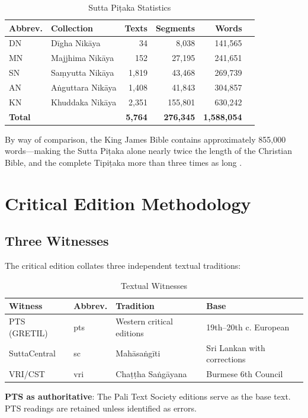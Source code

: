 \documentclass[unnumsec,webpdf,contemporary,large]{oup-authoring-template}
\begin{document}
\begin{table}[h]
\centering
\caption{Sutta Piṭaka Statistics}
\begin{tabular}{llrrrr}
\toprule
Abbrev. & Collection & Texts & Segments & Words \\
\midrule
DN & Dīgha Nikāya & 34 & 8,038 & 141,565 \\
MN & Majjhima Nikāya & 152 & 27,195 & 241,651 \\
SN & Saṃyutta Nikāya & 1,819 & 43,468 & 269,739 \\
AN & Aṅguttara Nikāya & 1,408 & 41,843 & 304,857 \\
KN & Khuddaka Nikāya & 2,351 & 155,801 & 630,242 \\
\midrule
\textbf{Total} & & \textbf{5,764} & \textbf{276,345} & \textbf{1,588,054} \\
\bottomrule
\end{tabular}
\end{table}

By way of comparison, the King James Bible contains approximately 855,000 words—making the Sutta Piṭaka alone nearly twice the length of the Christian Bible, and the complete Tipiṭaka more than three times as long \citep{zigmond2021}.

\section{Critical Edition Methodology}

\subsection{Three Witnesses}

The critical edition collates three independent textual traditions:

\begin{table}[h]
\centering
\caption{Textual Witnesses}
\begin{tabular}{llll}
\toprule
Witness & Abbrev. & Tradition & Base \\
\midrule
PTS (GRETIL) & pts & Western critical editions & 19th–20th c. European \\
SuttaCentral & sc & Mahāsaṅgīti & Sri Lankan with corrections \\
VRI/CST & vri & Chaṭṭha Saṅgāyana & Burmese 6th Council \\
\bottomrule
\end{tabular}
\end{table}

\textbf{PTS as authoritative}: The Pali Text Society editions serve as the base text. PTS readings are retained unless identified as errors.
\end{document}
